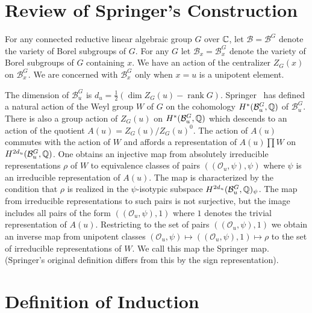 \documentclass{amsart}
\newcommand\bB{{\mathcal B}}
\newcommand\Bug	{\bB_u^G}
\newcommand\C		{{\Bbb C}}
\newcommand\HBug	{H^*(\Bug,\Q)}
\newcommand\cO		{{\mathcal O}}
\newcommand\Ou		{(\cO_u,\psi)}
\newcommand\Q		{{\Bbb Q}}
\newcommand\rank	{\operatorname{rank}}
\begin{document}

\section{Review of Springer's Construction} %

\bigskip

For any connected reductive linear algebraic group $G$ over $\C$,
let 
$\bB = \bB^G$ denote the variety of Borel subgroups of $G$.  For
any $G$ let
$\bB_x = \bB_x^G$ denote the variety of Borel subgroups of $G$
containing $x$.
We have an action of the centralizer $Z_G(x)$ on $\bB_x^G$.  We
are concerned
with $\bB_x^G$ only when $x = u$ is a unipotent element.

The dimension of $\Bug$ is $d_u = \frac 12(\dim Z_G(u) - \rank
G)$.  
Springer~\cites{Spr1,Spr2} has defined a natural action of
the Weyl 
group $W$ of $G$ on the 
cohomology $\HBug$ of $\Bug$.  There is also a group action of
$Z_G(u)$ on
$\HBug$ which descends to an action of the quotient 
$A(u) = Z_G(u) / Z_G(u)^0$.  The action of $A(u)$ commutes with
the action
of $W$ and affords a representation of $A(u) \prod W$ on
$H^{2d_u}(\Bug,\Q)$.  One obtains an injective map from
absolutely irreducible representations $\rho$ of $W$ to
equivalence classes of pairs $(\Ou,\psi)$ where $\psi$ is an
irreducible representation of $A(u)$.  The map is characterized
by the condition that $\rho$ is realized in the $\psi$-isotypic
subspace $H^{2d_u}(\Bug,\Q)_\psi$.  The map from irreducible
representations to such pairs is not surjective, but the image
includes all pairs of the form $(\Ou,1)$ where $1$ denotes the
trivial representation of $A(u)$.  Restricting to the set of
pairs $(\Ou,1)$ we obtain an inverse map from unipotent classes
$\Ou \mapsto (\Ou,1) \mapsto \rho$ to the set of irreducible
representations of $W$.  We call this map the Springer map. 
(Springer's original definition differs from this by the sign
representation).





\section{Definition of Induction} %

\bigskip
\newcommand\sphat{} %
\end{document}
